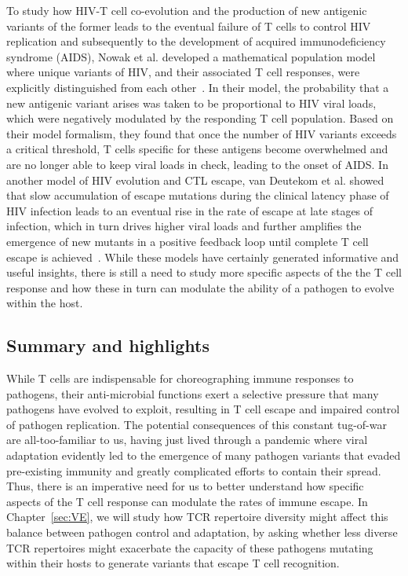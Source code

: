 To study how HIV-T cell co-evolution and the production of new antigenic variants of the former leads to the eventual failure of T cells to control HIV replication and subsequently to the development of acquired immunodeficiency syndrome (AIDS), Nowak et al. developed a mathematical population model where unique variants of HIV, and their associated T cell responses, were explicitly distinguished from each other~\cite{nowak1991antigenic}. In their model, the probability that a new antigenic variant arises was taken to be proportional to HIV viral loads, which were negatively modulated by the responding T cell population. Based on their model formalism, they found that once the number of HIV variants exceeds a critical threshold, T cells specific for these antigens become overwhelmed and are no longer able to keep viral loads in check, leading to the onset of AIDS. In another model of HIV evolution and CTL escape, van Deutekom et al. showed that slow accumulation of escape mutations during the clinical latency phase of HIV infection leads to an eventual rise in the rate of escape at late stages of infection, which in turn drives higher viral loads and further amplifies the emergence of new mutants in a positive feedback loop until complete T cell escape is achieved~\cite{van2013rate}. While these models have certainly generated informative and useful insights, there is still a need to study more specific aspects of the the T cell response and how these in turn can modulate the ability of a pathogen to evolve within the host.

\subsection{Summary and highlights}

While T cells are indispensable for choreographing immune responses to pathogens, their anti-microbial functions exert a selective pressure that many pathogens have evolved to exploit, resulting in T cell escape and impaired control of pathogen replication. The potential consequences of this constant tug-of-war are all-too-familiar to us, having just lived through a pandemic where viral adaptation evidently led to the emergence of many pathogen variants that evaded pre-existing immunity and greatly complicated efforts to contain their spread. Thus, there is an imperative need for us to better understand how specific aspects of the T cell response can modulate the rates of immune escape. In Chapter~\ref{sec:VE}, we will study how TCR repertoire diversity might affect this balance between pathogen control and adaptation, by asking whether less diverse TCR repertoires might exacerbate the capacity of these pathogens mutating within their hosts to generate variants that escape T cell recognition.